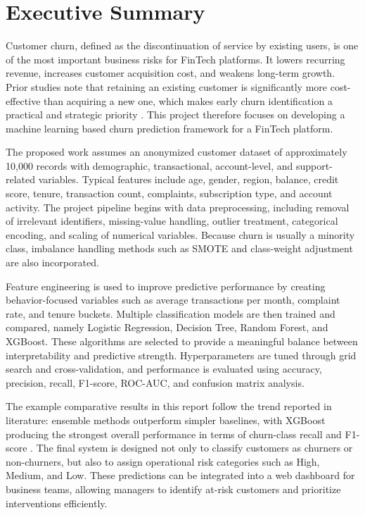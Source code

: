 \clearpage
{}
{}
\chapter*{Executive Summary}

Customer churn, defined as the discontinuation of service by existing users, is one of the most important business risks for FinTech platforms. It lowers recurring revenue, increases customer acquisition cost, and weakens long-term growth. Prior studies note that retaining an existing customer is significantly more cost-effective than acquiring a new one, which makes early churn identification a practical and strategic priority \cite{systematicreview,bhattacharjee2026}. This project therefore focuses on developing a machine learning based churn prediction framework for a FinTech platform.

The proposed work assumes an anonymized customer dataset of approximately 10{,}000 records with demographic, transactional, account-level, and support-related variables. Typical features include age, gender, region, balance, credit score, tenure, transaction count, complaints, subscription type, and account activity. The project pipeline begins with data preprocessing, including removal of irrelevant identifiers, missing-value handling, outlier treatment, categorical encoding, and scaling of numerical variables. Because churn is usually a minority class, imbalance handling methods such as SMOTE and class-weight adjustment are also incorporated.

Feature engineering is used to improve predictive performance by creating behavior-focused variables such as average transactions per month, complaint rate, and tenure buckets. Multiple classification models are then trained and compared, namely Logistic Regression, Decision Tree, Random Forest, and XGBoost. These algorithms are selected to provide a meaningful balance between interpretability and predictive strength. Hyperparameters are tuned through grid search and cross-validation, and performance is evaluated using accuracy, precision, recall, F1-score, ROC-AUC, and confusion matrix analysis.

The example comparative results in this report follow the trend reported in literature: ensemble methods outperform simpler baselines, with XGBoost producing the strongest overall performance in terms of churn-class recall and F1-score \cite{imani2024,bhattacharjee2026}. The final system is designed not only to classify customers as churners or non-churners, but also to assign operational risk categories such as High, Medium, and Low. These predictions can be integrated into a web dashboard for business teams, allowing managers to identify at-risk customers and prioritize interventions efficiently.

